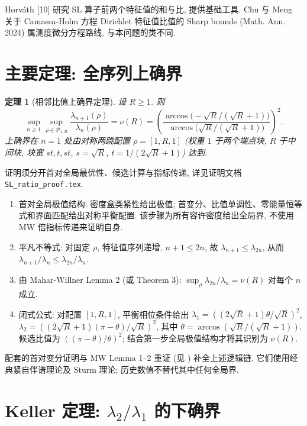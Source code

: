 \documentclass[UTF8]{ctexart}
\newtheorem{theorem}{定理}[section]
\begin{document}
Horv\'ath [10] 研究 SL 算子前两个特征值的和与比, 提供基础工具. Chu 与 Meng 关于 Camassa-Holm 方程 Dirichlet 特征值比值的 Sharp bounds (Math. Ann. 2024) 属测度微分方程路线, 与本问题的类不同.

\section{主要定理: 全序列上确界}

\begin{theorem}[相邻比值上确界定理]
设 $R \geq 1$. 则
\begin{equation}
	\sup_{n \geq 1} \sup_{\rho \in \mathcal{P}_{1,R}} \frac{\lambda_{n+1}(\rho)}{\lambda_n(\rho)}
	= \nu(R) = \left( \frac{\arccos\!\bigl(-\sqrt{R}/(\sqrt{R}+1)\bigr)}
	{\arccos\!\bigl(\sqrt{R}/(\sqrt{R}+1)\bigr)} \right)^2 .
\end{equation}
上确界在 $n = 1$ 处由对称两跳配置 $\rho = [1, R, 1]$ (权重 $1$ 于两个端点块, $R$ 于中间块,
块宽 $s t, t, s t$, $s = \sqrt{R}$, $t = 1/(2\sqrt{R}+1)$) 达到.
\end{theorem}

证明须分开首对全局最优性、候选计算与指标传递, 详见证明文档
\texttt{SL\_ratio\_proof.tex}.

\begin{enumerate}
	\item 首对全局极值结构: 密度盒类紧性给出极值;
		首变分、比值单调性、零能量恒等式和界面匹配给出对称平衡配置.
		该步骤为所有容许密度给出全局界, 不使用 MW 倍指标传递来证明自身.
	\item 平凡不等式: 对固定 $\rho$, 特征值序列递增, $n+1 \leq 2n$, 故
		$\lambda_{n+1} \leq \lambda_{2n}$, 从而
		$\lambda_{n+1}/\lambda_n \leq \lambda_{2n}/\lambda_n$.
	\item 由 Mahar-Willner Lemma 2 (或 Theorem 3):
		$\sup_{\rho} \lambda_{2n}/\lambda_n = \nu(R)$ 对每个 $n$ 成立.
	\item 闭式公式: 对配置 $[1, R, 1]$, 平衡相位条件给出
		$\lambda_1 = ((2\sqrt{R}+1)\theta/\sqrt{R})^2$, $\lambda_2 = ((2\sqrt{R}+1)(\pi-\theta)/\sqrt{R})^2$,
		其中 $\theta = \arccos(\sqrt{R}/(\sqrt{R}+1))$.
		候选比值为 $((\pi-\theta)/\theta)^2$; 结合第一步全局极值结构才将其识别为 $\nu(R)$.
\end{enumerate}

配套的首对变分证明与 MW Lemma 1--2 重证
(见 ) 补全上述逻辑链.
它们使用经典紧自伴谱理论及 Sturm 理论; 历史数值不替代其中任何全局界.

\section{Keller 定理: \texorpdfstring{$\lambda_2/\lambda_1$}{lambda2/lambda1} 的下确界}
\end{document}
